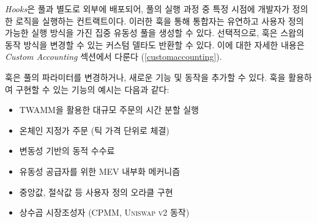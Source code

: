 \documentclass[sigconf,nonacm,prologue,table]{acmart}
\numberwithin{equation}{section}
\theoremstyle{definition}
\theoremstyle{remark}
\begin{document}
\emph{Hooks}은 풀과 별도로 외부에 배포되어, 풀의 실행 과정 중 특정 시점에 개발자가 정의한 로직을 실행하는 컨트랙트이다. 이러한 훅을 통해 통합자는 유연하고 사용자 정의 가능한 실행 방식을 가진 집중 유동성 풀을 생성할 수 있다. 선택적으로, 훅은 스왑의 동작 방식을 변경할 수 있는 커스텀 델타도 반환할 수 있다. 이에 대한 자세한 내용은 \emph{Custom Accounting} 섹션에서 다룬다 (\ref{customaccounting}).

훅은 풀의 파라미터를 변경하거나, 새로운 기능 및 동작을 추가할 수 있다. 훅을 활용하여 구현할 수 있는 기능의 예시는 다음과 같다:
\begin{itemize}
\item TWAMM을 활용한 대규모 주문의 시간 분할 실행 \cite{White2021}
\item 온체인 지정가 주문 (틱 가격 단위로 체결)
\item 변동성 기반의 동적 수수료
\item 유동성 공급자를 위한 MEV 내부화 메커니즘 \cite{adams2024amm}
\item 중앙값, 절삭값 등 사용자 정의 오라클 구현
\item 상수곱 시장조성자 (CPMM, \textsc{Uniswap v2} 동작)
\end{itemize}
\end{document}
